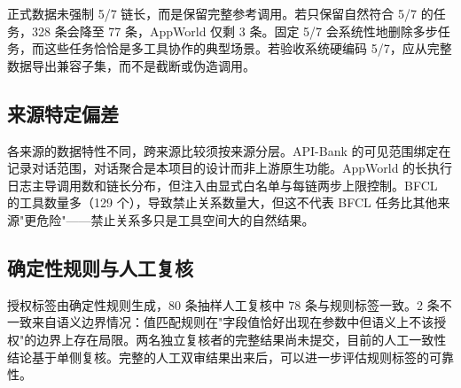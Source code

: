 正式数据未强制 5/7 链长，而是保留完整参考调用。若只保留自然符合 5/7 的任务，328 条会降至 77 条，AppWorld 仅剩 3 条。固定 5/7 会系统性地删除多步任务，而这些任务恰恰是多工具协作的典型场景。若验收系统硬编码 5/7，应从完整数据导出兼容子集，而不是截断或伪造调用。

\subsection{来源特定偏差}

各来源的数据特性不同，跨来源比较须按来源分层。API-Bank 的可见范围绑定在记录对话范围，对话聚合是本项目的设计而非上游原生功能。AppWorld 的长执行日志主导调用数和链长分布，但注入由显式白名单与每链两步上限控制。BFCL 的工具数量多（129 个），导致禁止关系数量大，但这不代表 BFCL 任务比其他来源"更危险"——禁止关系多只是工具空间大的自然结果。

\subsection{确定性规则与人工复核}

授权标签由确定性规则生成，80 条抽样人工复核中 78 条与规则标签一致。2 条不一致来自语义边界情况：值匹配规则在"字段值恰好出现在参数中但语义上不该授权"的边界上存在局限。两名独立复核者的完整结果尚未提交，目前的人工一致性结论基于单侧复核。完整的人工双审结果出来后，可以进一步评估规则标签的可靠性。



